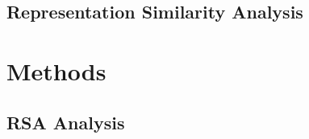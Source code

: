 \documentclass[11pt,a4paper]{article}
\begin{document}
  \subsection{Representation Similarity Analysis}%
    \label{sub:Representation Similarity Analysis}
    

\section{Methods}%
  \label{sec:Methods}

  \subsection{RSA Analysis}%
    \label{sub:RSA Analysis}
   
  
  
  
% 
\printbibliography
\setcounter{figure}{0}
\renewcommand{\thefigure}{S\arabic{figure}}
\renewcommand{\figurename}{Supplementary Figure}

\setcounter{subsection}{0}
\renewcommand{\thesubsection}{S\arabic{subsection}}
\renewcommand{\thesubsubsection}{S\arabic{subsection}.\arabic{subsubsection}}

\clearpage

%
\end{document}
